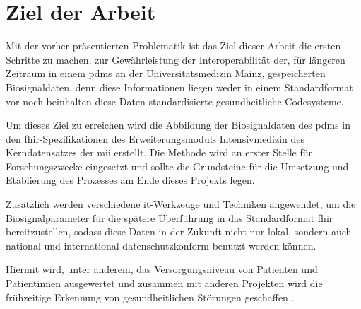 \section{Ziel der Arbeit} \label{sec:goal}

Mit der vorher präsentierten Problematik ist das Ziel dieser Arbeit die ersten Schritte zu machen, zur Gewährleistung der Interoperabilität der, für längeren Zeitraum in einem \ac{pdms} an der Universitätsmedizin Mainz, gespeicherten Biosignaldaten, denn diese Informationen liegen weder in einem Standardformat vor noch beinhalten diese Daten standardisierte gesundheitliche Codesysteme. 

Um dieses Ziel zu erreichen wird die Abbildung der Biosignaldaten des \ac{pdms} in den \ac{fhir}-Spezifikationen des Erweiterungsmoduls \glqq Intensivmedizin\grqq{} des Kerndatensatzes der \ac{mii} erstellt. Die Methode wird an erster Stelle für Forschungszwecke eingesetzt und sollte die Grundsteine für die Umsetzung und Etablierung des Prozesses am Ende dieses Projekts legen. 

Zusätzlich werden verschiedene \ac{it}-Werkzeuge und Techniken angewendet, um die Biosignalparameter für die spätere Überführung in das Standardformat \ac{fhir} bereitzustellen, sodass diese Daten in der Zukunft nicht nur lokal, sondern auch national und international datenschutzkonform benutzt werden können. 

Hiermit wird, unter anderem, das Versorgungsniveau von Patienten und Patientinnen ausgewertet und zusammen mit anderen Projekten wird die frühzeitige Erkennung von gesundheitlichen Störungen geschaffen \cite{icukdz}.